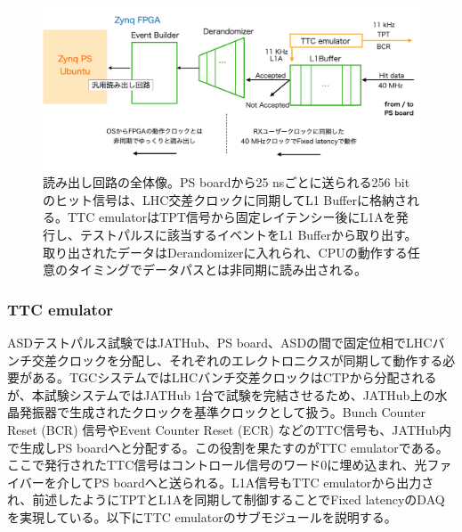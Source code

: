 \begin{figure} 
\centering
\includegraphics[width=16cm]{fig/QAQC/JATHubdaq.png}
\caption[読み出し回路の全体像]{読み出し回路の全体像。PS boardから25 nsごとに送られる256 bitのヒット信号は、LHC交差クロックに同期してL1 Bufferに格納される。TTC emulatorはTPT信号から固定レイテンシー後にL1Aを発行し、テストパルスに該当するイベントをL1 Bufferから取り出す。取り出されたデータはDerandomizerに入れられ、CPUの動作する任意のタイミングでデータパスとは非同期に読み出される。}
\label{JATHubdaq}
\end{figure}

\subsubsection{TTC emulator}
\baselineskip
ASDテストパルス試験ではJATHub、PS board、ASDの間で固定位相でLHCバンチ交差クロックを分配し、それぞれのエレクトロニクスが同期して動作する必要がある。TGCシステムではLHCバンチ交差クロックはCTPから分配されるが、本試験システムではJATHub 1台で試験を完結させるため、JATHub上の水晶発振器で生成されたクロックを基準クロックとして扱う。Bunch Counter Reset (BCR) 信号やEvent Counter Reset (ECR) などのTTC信号も、JATHub内で生成しPS boardへと分配する。この役割を果たすのがTTC emulatorである。ここで発行されたTTC信号はコントロール信号のワード0に埋め込まれ、光ファイバーを介してPS boardへと送られる。L1A信号もTTC emulatorから出力され、前述したようにTPTとL1Aを同期して制御することでFixed latencyのDAQを実現している。以下にTTC emulatorのサブモジュールを説明する。

